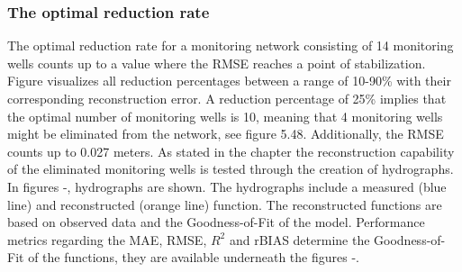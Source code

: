 \subsubsection{The optimal reduction rate}
The optimal reduction rate for a monitoring network consisting of 14 monitoring wells counts up to a value where the RMSE reaches a point of stabilization. Figure  visualizes all reduction percentages between a range of 10-90\% with their corresponding reconstruction error. 
A reduction percentage of 25\% implies that the optimal number of monitoring wells is 10, meaning that 4 monitoring wells might be eliminated from the network, see figure 5.48. Additionally, the RMSE counts up to 0.027 meters. As stated in the chapter  the reconstruction capability of the eliminated monitoring wells is tested through the creation of hydrographs. In figures -, hydrographs are shown. The hydrographs include a measured (blue line) and reconstructed (orange line) function. The reconstructed functions are based on observed data and the Goodness-of-Fit of the model. Performance metrics regarding the MAE, RMSE, $R^2$ and rBIAS determine the Goodness-of-Fit of the functions, they are available underneath the figures -. 

